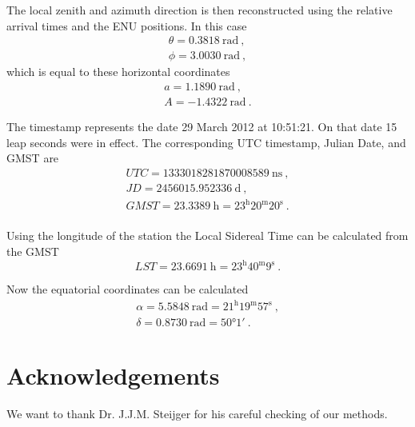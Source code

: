 The local zenith and azimuth direction is then reconstructed using the
relative arrival times and the ENU positions. In this case
%
\begin{equation}
    \begin{array}{l}
        \theta = \SI{0.3818}{\radian} \ , \\
        \phi = \SI{3.0030}{\radian} \ ,
    \end{array}
\end{equation}
%
which is equal to these horizontal coordinates
%
\begin{equation}
    \begin{array}{l}
        a = \SI{1.1890}{\radian} \ , \\
        A = \SI{-1.4322}{\radian} \ .
    \end{array}
\end{equation}

The \gps timestamp represents the date 29 March 2012 at 10:51:21. On
that date 15 leap seconds were in effect. The corresponding UTC
timestamp, Julian Date, and GMST are
%
\begin{equation}
    \begin{array}{l}
        \mathit{UTC} = \SI{1333018281870008589}{\nano\second} \ , \\
        \mathit{JD} = \SI{2456015.952336}{\day} \ , \\
        \mathit{GMST} = \SI{23.3389}{\hour} = 23^\mathrm{h}20^\mathrm{m}20^\mathrm{s} \ . \\
    \end{array}
\end{equation}

Using the longitude of the station the Local Sidereal Time can be
calculated from the GMST
%
\begin{equation}
    \mathit{LST} = \SI{23.6691}{\hour} = 23^\mathrm{h}40^\mathrm{m}9^\mathrm{s} \ .
\end{equation}

Now the equatorial coordinates can be calculated
%
\begin{equation}
    \begin{array}{l}
        \alpha = \SI{5.5848}{\radian} = 21^\mathrm{h}19^\mathrm{m}57^\mathrm{s} \ , \\
        \delta = \SI{0.8730}{\radian} = \ang{50;1;} \ .
    \end{array}
\end{equation}


\section{Acknowledgements}

We want to thank Dr. J.J.M. Steijger for his careful checking of our
methods.
